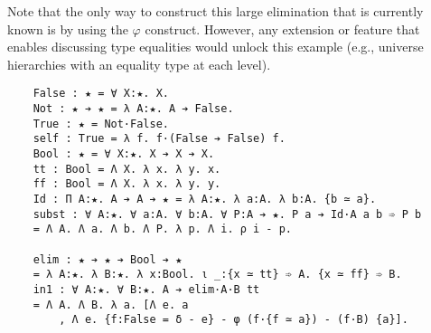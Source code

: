 \begin{enumerate}
{        Note that the only way to construct this large elimination that is currently known is by using the $\varphi$ construct.
        However, any extension or feature that enables discussing type equalities would unlock this example (e.g., universe hierarchies with an equality type at each level).
\begin{verbatim}
    False : ★ = ∀ X:★. X.
    Not : ★ ➔ ★ = λ A:★. A ➔ False.
    True : ★ = Not·False.
    self : True = λ f. f·(False ➔ False) f.
    Bool : ★ = ∀ X:★. X ➔ X ➔ X.
    tt : Bool = Λ X. λ x. λ y. x.
    ff : Bool = Λ X. λ x. λ y. y.
    Id : Π A:★. A ➔ A ➔ ★ = λ A:★. λ a:A. λ b:A. {b ≃ a}.
    subst : ∀ A:★. ∀ a:A. ∀ b:A. ∀ P:A ➔ ★. P a ➔ Id·A a b ➾ P b
    = Λ A. Λ a. Λ b. Λ P. λ p. Λ i. ρ i - p.
    
    elim : ★ ➔ ★ ➔ Bool ➔ ★
    = λ A:★. λ B:★. λ x:Bool. ι _:{x ≃ tt} ➾ A. {x ≃ ff} ➾ B.
    in1 : ∀ A:★. ∀ B:★. A ➔ elim·A·B tt
    = Λ A. Λ B. λ a. [Λ e. a
        , Λ e. {f:False = δ - e} - φ (f·{f ≃ a}) - (f·B) {a}].
    

\end{verbatim}}
\end{enumerate}
